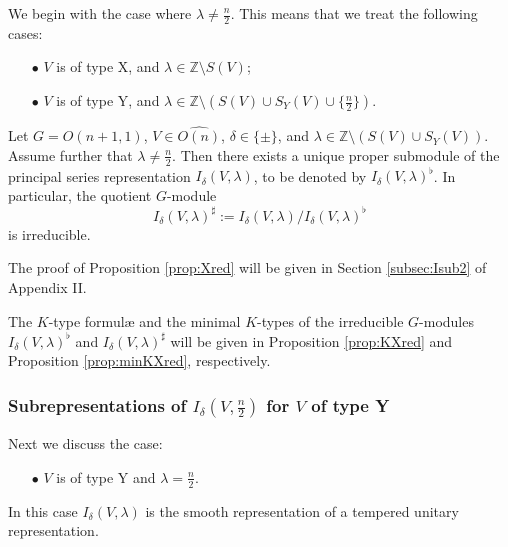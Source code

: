 We begin with the case
 where $\lambda \ne \frac n 2$.  
This means that we treat the following cases:
\begin{enumerate}
\item[$\bullet$]
$V$ is of type X, 
 and $\lambda \in {\mathbb{Z}} \setminus S(V)$;
\item[$\bullet$]
$V$ is of type Y, 
 and $\lambda \in {\mathbb{Z}} \setminus (S(V) \cup S_Y(V)\cup \{\frac n 2\})$. \end{enumerate}

\begin{proposition}
\label{prop:Xred}
Let $G=O(n+1,1)$, 
 $V \in \widehat{O(n)}$, 
$\delta \in \{\pm\}$, 
 and $\lambda \in {\mathbb{Z}} \setminus (S(V) \cup S_Y(V))$.  
Assume further that $\lambda \ne \frac n 2$.  
Then there exists a unique proper submodule
 of the principal series representation
 $I_{\delta}(V,\lambda)$, 
 to be denoted by 
$I_{\delta}(V,\lambda)^{\flat}$.  
In particular, 
 the quotient $G$-module
\[
  I_{\delta}(V,\lambda)^{\sharp}
  :=
  I_{\delta}(V,\lambda)
  /I_{\delta}(V,\lambda)^{\flat}
\]
is irreducible.  
\end{proposition}

The proof of Proposition \ref{prop:Xred} will be given 
 in Section \ref{subsec:Isub2} of  Appendix II.  

\begin{remark}
The $K$-type formul{\ae}
 and the minimal $K$-types
 of the irreducible $G$-modules $I_{\delta}(V,\lambda)^{\flat}$
 and $I_{\delta}(V,\lambda)^{\sharp}$
 will be given
 in Proposition \ref{prop:KXred}
 and Proposition \ref{prop:minKXred}, 
 respectively.  
\end{remark}

\subsubsection
{Subrepresentations of $I_{\delta}(V,\frac n 2)$
 for $V$ of type Y}
\label{subsec:Isub3}

Next we discuss the case:
\begin{enumerate}
\item[$\bullet$]
$V$ is of type Y and $\lambda = \frac n 2$.  
\end{enumerate}


In this case $I_{\delta}(V,\lambda)$ is the smooth representation
 of a tempered unitary representation.  

